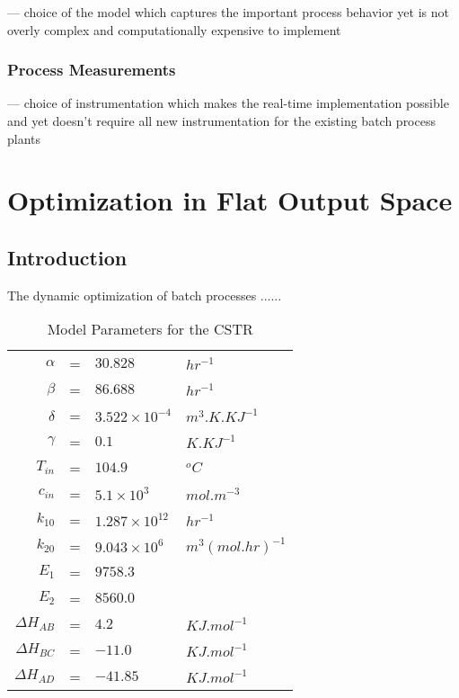 \documentclass[11pt]{report}
\begin{document}
--- choice of the model which captures the important process behavior yet is
not overly complex and computationally expensive to implement

\subsection{Process Measurements}

--- choice of instrumentation which makes the real-time implementation
possible and yet doesn't require all new instrumentation for the existing
batch process plants

\chapter{Optimization in Flat Output Space}

\section{Introduction}

The dynamic optimization of batch processes ......

\begin{table}[h]  \centering%
%
\caption{Model Parameters for the CSTR
\label{cstrtable}}\bigskip 

\begin{center}
\begin{tabular}{rlll}
\hline
$\alpha $ & = & $30.828$ & $hr^{-1}$ \\ 
$\beta $ & = & $86.688$ & $hr^{-1}$ \\ 
$\delta $ & = & $3.522\times 10^{-4}$ & $m^{3}.K.KJ^{-1}$ \\ 
$\gamma $ & = & $0.1$ & $K.KJ^{-1}$ \\ 
$T_{in}$ & = & $104.9$ & $^{o}C$ \\ 
$c_{in}$ & = & $5.1\times 10^{3}$ & $mol.m^{-3}$ \\ 
$k_{10}$ & = & $1.287\times 10^{12}$ & $hr^{-1}$ \\ 
$k_{20}$ & = & $9.043\times 10^{6}$ & $m^{3}(mol.hr)^{-1}$ \\ 
$E_{1}$ & = & $9758.3$ &  \\ 
$E_{2}$ & = & $8560.0$ &  \\ 
$\Delta H_{AB}$ & = & $4.2$ & $KJ.mol^{-1}$ \\ 
$\Delta H_{BC}$ & = & $-11.0$ & $KJ.mol^{-1}$ \\ 
$\Delta H_{AD}$ & = & $-41.85$ & $KJ.mol^{-1}$ \\ \hline
\end{tabular}
\end{center}

\end{table}%
%
\end{document}
